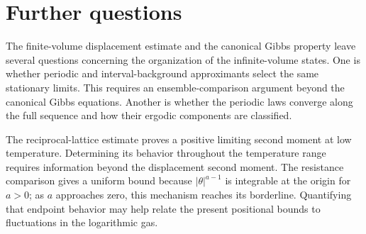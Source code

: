 \documentclass[11pt]{article}
\theoremstyle{remark}\newtheorem{remark}[theorem]{Remark}
\begin{document}
\section{Further questions}

The finite-volume displacement estimate and the canonical Gibbs
property leave several questions concerning the organization of
the infinite-volume states. One is whether periodic and
interval-background approximants select the same stationary
limits. This requires an ensemble-comparison argument beyond the
canonical Gibbs equations. Another is whether the periodic laws
converge along the full sequence and how their ergodic components
are classified.

The reciprocal-lattice estimate proves a positive limiting second
moment at low temperature. Determining its behavior throughout
the temperature range requires information beyond the displacement
second moment. The resistance comparison gives a uniform bound
because $|\theta|^{a-1}$ is integrable at the origin for $a>0$;
as $a$ approaches zero, this mechanism reaches its borderline.
Quantifying that endpoint behavior may help relate the present
positional bounds to fluctuations in the logarithmic gas.
\end{document}

